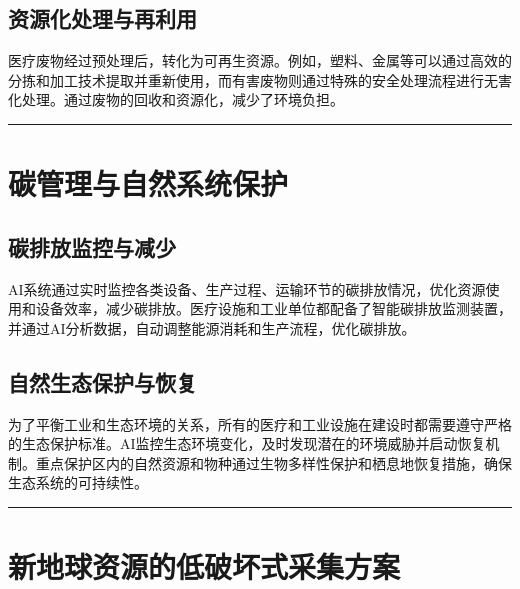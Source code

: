 \subsection{资源化处理与再利用}\label{ux8d44ux6e90ux5316ux5904ux7406ux4e0eux518dux5229ux7528}

医疗废物经过预处理后，转化为可再生资源。例如，塑料、金属等可以通过高效的分拣和加工技术提取并重新使用，而有害废物则通过特殊的安全处理流程进行无害化处理。通过废物的回收和资源化，减少了环境负担。

\begin{center}\rule{0.5\linewidth}{0.5pt}\end{center}

\section{碳管理与自然系统保护}\label{ux78b3ux7ba1ux7406ux4e0eux81eaux7136ux7cfbux7edfux4fddux62a4}

\subsection{碳排放监控与减少}\label{ux78b3ux6392ux653eux76d1ux63a7ux4e0eux51cfux5c11}

AI系统通过实时监控各类设备、生产过程、运输环节的碳排放情况，优化资源使用和设备效率，减少碳排放。医疗设施和工业单位都配备了智能碳排放监测装置，并通过AI分析数据，自动调整能源消耗和生产流程，优化碳排放。

\subsection{自然生态保护与恢复}\label{ux81eaux7136ux751fux6001ux4fddux62a4ux4e0eux6062ux590d}

为了平衡工业和生态环境的关系，所有的医疗和工业设施在建设时都需要遵守严格的生态保护标准。AI监控生态环境变化，及时发现潜在的环境威胁并启动恢复机制。重点保护区内的自然资源和物种通过生物多样性保护和栖息地恢复措施，确保生态系统的可持续性。

\begin{center}\rule{0.5\linewidth}{0.5pt}\end{center}

\section{新地球资源的低破坏式采集方案}\label{ux65b0ux5730ux7403ux8d44ux6e90ux7684ux4f4eux7834ux574fux5f0fux91c7ux96c6ux65b9ux6848}

